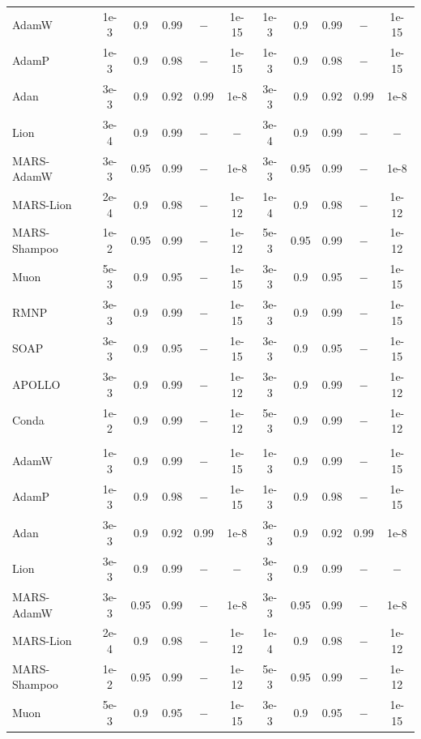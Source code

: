 \begin{table}[!htbp]
{\begin{tabular}{l ccccc | ccccc}
AdamW        & 1e-3 & 0.9  & 0.99 & $-$   & 1e-15 & 1e-3 & 0.9  & 0.99 & $-$   & 1e-15 \\
AdamP        & 1e-3 & 0.9  & 0.98 & $-$   & 1e-15 & 1e-3 & 0.9  & 0.98 & $-$   & 1e-15 \\
Adan         & 3e-3 & 0.9  & 0.92 & 0.99 & 1e-8  & 3e-3 & 0.9  & 0.92 & 0.99 & 1e-8  \\
Lion         & 3e-4 & 0.9  & 0.99 & $-$   & $-$    & 3e-4 & 0.9  & 0.99 & $-$   & $-$    \\
MARS-AdamW   & 3e-3 & 0.95 & 0.99 & $-$   & 1e-8  & 3e-3 & 0.95 & 0.99 & $-$   & 1e-8  \\
MARS-Lion    & 2e-4 & 0.9  & 0.98 & $-$   & 1e-12 & 1e-4 & 0.9  & 0.98 & $-$   & 1e-12 \\
MARS-Shampoo & 1e-2 & 0.95 & 0.99 & $-$   & 1e-12 & 5e-3 & 0.95 & 0.99 & $-$   & 1e-12 \\
Muon         & 5e-3 & 0.9  & 0.95 & $-$   & 1e-15 & 3e-3 & 0.9  & 0.95 & $-$   & 1e-15 \\
RMNP         & 3e-3 & 0.9  & 0.99 & $-$   & 1e-15 & 3e-3 & 0.9  & 0.99 & $-$   & 1e-15 \\
SOAP         & 3e-3 & 0.9  & 0.95 & $-$   & 1e-15 & 3e-3 & 0.9  & 0.95 & $-$   & 1e-15 \\
APOLLO       & 3e-3 & 0.9  & 0.99 & $-$   & 1e-12 & 3e-3 & 0.9  & 0.99 & $-$   & 1e-12 \\
Conda        & 1e-2 & 0.9  & 0.99 & $-$   & 1e-12 & 5e-3 & 0.9  & 0.99 & $-$   & 1e-12 \\
\midrule
\rowcolor{basebg}
\multicolumn{11}{l}{\textit{DeltaNet}} \\
AdamW        & 1e-3 & 0.9  & 0.99 & $-$   & 1e-15 & 1e-3 & 0.9  & 0.99 & $-$   & 1e-15 \\
AdamP        & 1e-3 & 0.9  & 0.98 & $-$   & 1e-15 & 1e-3 & 0.9  & 0.98 & $-$   & 1e-15 \\
Adan         & 3e-3 & 0.9  & 0.92 & 0.99 & 1e-8  & 3e-3 & 0.9  & 0.92 & 0.99 & 1e-8  \\
Lion         & 3e-3 & 0.9  & 0.99 & $-$   & $-$    & 3e-3 & 0.9  & 0.99 & $-$   & $-$    \\
MARS-AdamW   & 3e-3 & 0.95 & 0.99 & $-$   & 1e-8  & 3e-3 & 0.95 & 0.99 & $-$   & 1e-8  \\
MARS-Lion    & 2e-4 & 0.9  & 0.98 & $-$   & 1e-12 & 1e-4 & 0.9  & 0.98 & $-$   & 1e-12 \\
MARS-Shampoo & 1e-2 & 0.95 & 0.99 & $-$   & 1e-12 & 5e-3 & 0.95 & 0.99 & $-$   & 1e-12 \\
Muon         & 5e-3 & 0.9  & 0.95 & $-$   & 1e-15 & 3e-3 & 0.9  & 0.95 & $-$   & 1e-15 \\

\end{tabular}}
\end{table}
